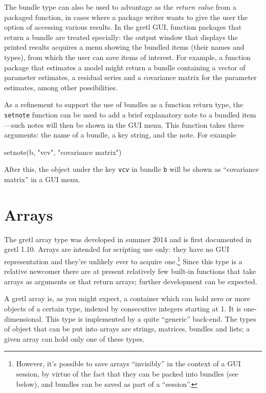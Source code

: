 The bundle type can also be used to advantage as the \textit{return
  value} from a packaged function, in cases where a package writer
wants to give the user the option of accessing various results. In the
gretl GUI, function packages that return a bundle are treated
specially: the output window that displays the printed results
acquires a menu showing the bundled items (their names and types),
from which the user can save items of interest. For example, a
function package that estimates a model might return a bundle 
containing a vector of parameter estimates, a residual series and a
covariance matrix for the parameter estimates, among other
possibilities.

As a refinement to support the use of bundles as a function return
type, the \texttt{setnote} function can be used to add a brief
explanatory note to a bundled item---such notes will then be shown in
the GUI menu.  This function takes three arguments: the name of a
bundle, a key string, and the note. For example

\begin{code}
setnote(b, "vcv", "covariance matrix")
\end{code}

After this, the object under the key \texttt{vcv} in bundle \texttt{b}
will be shown as ``covariance matrix'' in a GUI menu.

\section{Arrays}
\label{sec:arrays}

The gretl array type was developed in summer 2014 and is first
documented in gretl 1.10.  Arrays are intended for scripting use only:
they have no GUI representation and they're unlikely ever to acquire
one.\footnote{However, it's possible to save arrays ``invisibly'' in
  the context of a GUI session, by virtue of the fact that they can be
  packed into bundles (see below), and bundles can be saved as part of
  a ``session''.} Since this type is a relative newcomer there are at
present relatively few built-in functions that take arrays as
arguments or that return arrays; further development can be expected.

A gretl array is, as you might expect, a container which can hold zero
or more objects of a certain type, indexed by consecutive integers
starting at 1. It is one-dimensional. This type is implemented by a
quite ``generic'' back-end. The types of object that can be
put into arrays are strings, matrices, bundles and lists; a given
array can hold only one of these types. 

